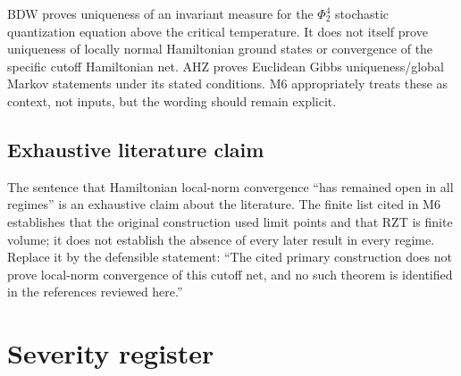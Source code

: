 \documentclass[10pt,a4paper]{article}
\begin{document}
BDW proves uniqueness of an invariant measure for the $\Phi^4_2$ stochastic quantization
equation above the critical temperature.  It does not itself prove uniqueness of locally
normal Hamiltonian ground states or convergence of the specific cutoff Hamiltonian net.
AHZ proves Euclidean Gibbs uniqueness/global Markov statements under its stated conditions.
M6 appropriately treats these as context, not inputs, but the wording should remain explicit.

\subsection{Exhaustive literature claim}

The sentence that Hamiltonian local-norm convergence ``has remained open in all regimes'' is
an exhaustive claim about the literature.  The finite list cited in M6 establishes that the
original construction used limit points and that RZT is finite volume; it does not establish
the absence of every later result in every regime.  Replace it by the defensible statement:
``The cited primary construction does not prove local-norm convergence of this cutoff net,
and no such theorem is identified in the references reviewed here.''

\section{Severity register}
\end{document}
